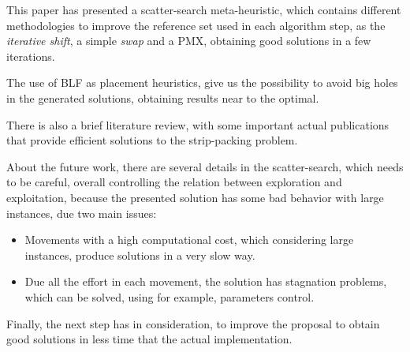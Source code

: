 This paper has presented a scatter-search meta-heuristic,
which contains different methodologies to improve
the reference set used in each algorithm step,
as the \emph{iterative shift}, a simple \emph{swap}
and a PMX,
obtaining good solutions in a few iterations.

The use of BLF as placement heuristics,
give us the possibility to avoid big holes in the generated
solutions, obtaining results near to the optimal.

There is also a brief literature review,
with some important actual publications
that provide efficient solutions to the
strip-packing problem.

About the future work,
there are several details in the scatter-search,
which needs to be careful, overall
controlling the relation between exploration
and exploitation, because the presented solution
has some bad behavior with large instances,
due two main issues:

\begin{itemize}
    \item Movements with a high computational cost,
        which considering large instances, produce
        solutions in a very slow way.
    \item Due all the effort in each movement,
        the solution has stagnation problems,
        which can be solved, using for example,
        parameters control.
\end{itemize}

Finally,
the next step has in consideration,
to improve the proposal to obtain
good solutions in less time that the actual
implementation.
